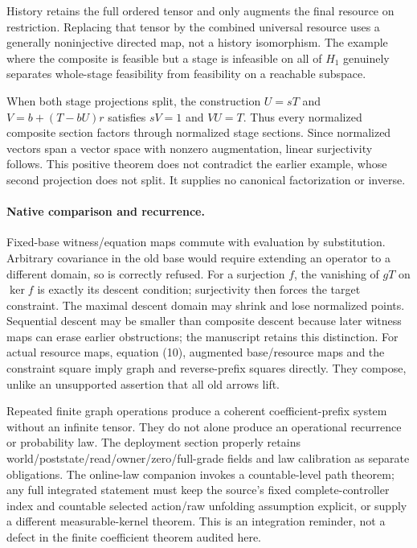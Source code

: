 \documentclass{article}
\begin{document}
History retains the full ordered tensor and only augments the final resource on restriction. Replacing that tensor by the combined universal resource uses a generally noninjective directed map, not a history isomorphism. The example where the composite is feasible but a stage is infeasible on all of $H_1$ genuinely separates whole-stage feasibility from feasibility on a reachable subspace.

When both stage projections split, the construction $U=sT$ and $V=b+(T-bU)r$ satisfies $sV=1$ and $VU=T$. Thus every normalized composite section factors through normalized stage sections. Since normalized vectors span a vector space with nonzero augmentation, linear surjectivity follows. This positive theorem does not contradict the earlier example, whose second projection does not split. It supplies no canonical factorization or inverse.

\paragraph{Native comparison and recurrence.}
Fixed-base witness/equation maps commute with evaluation by substitution. Arbitrary covariance in the old base would require extending an operator to a different domain, so is correctly refused. For a surjection $f$, the vanishing of $gT$ on $\ker f$ is exactly its descent condition; surjectivity then forces the target constraint. The maximal descent domain may shrink and lose normalized points. Sequential descent may be smaller than composite descent because later witness maps can erase earlier obstructions; the manuscript retains this distinction. For actual resource maps, equation (10), augmented base/resource maps and the constraint square imply graph and reverse-prefix squares directly. They compose, unlike an unsupported assertion that all old arrows lift.

Repeated finite graph operations produce a coherent coefficient-prefix system without an infinite tensor. They do not alone produce an operational recurrence or probability law. The deployment section properly retains world/poststate/read/owner/zero/full-grade fields and law calibration as separate obligations. The online-law companion invokes a countable-level path theorem; any full integrated statement must keep the source's fixed complete-controller index and countable selected action/raw unfolding assumption explicit, or supply a different measurable-kernel theorem. This is an integration reminder, not a defect in the finite coefficient theorem audited here.
\end{document}
